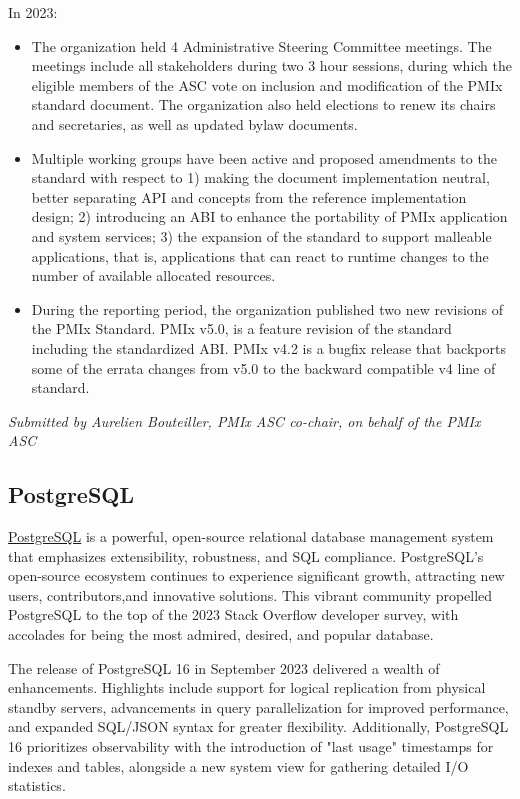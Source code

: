 \documentclass[a4paper]{report}
\begin{document}
In 2023:

\begin{itemize}

\item The organization held 4 Administrative Steering Committee meetings. The meetings include all stakeholders during two 3 hour sessions, during which the eligible members of the ASC vote on inclusion and modification of the PMIx standard document. The organization also held elections to renew its chairs and secretaries, as well as updated bylaw documents.

\item Multiple working groups have been active and proposed amendments to the standard with respect to 1) making the document implementation neutral, better separating API and concepts from the reference implementation design; 2) introducing an ABI to enhance the portability of PMIx application and system services; 3) the expansion of the standard to support malleable applications, that is, applications that can react to runtime changes to the number of available allocated resources.

\item During the reporting period, the organization published two new revisions of the PMIx Standard. PMIx v5.0, is a feature revision of the standard including the standardized ABI. PMIx v4.2 is a bugfix release that backports some of the errata changes from v5.0 to the backward compatible v4 line of standard.

\end{itemize}

{\em Submitted by Aurelien Bouteiller, PMIx ASC co-chair, on behalf of the PMIx ASC}

\subsection{PostgreSQL}

\href{https://www.postgresql.org/}{PostgreSQL} is a powerful, open-source relational database management system that emphasizes extensibility, robustness, and SQL compliance.  PostgreSQL's open-source ecosystem continues to experience significant growth, attracting new users, contributors,and innovative solutions.  This vibrant community propelled PostgreSQL to the top of the 2023 Stack Overflow developer survey, with accolades for being the most admired, desired, and popular database.

The release of PostgreSQL 16 in September 2023 delivered a wealth of enhancements. Highlights include support for logical replication from physical standby servers, advancements in query parallelization for improved performance, and expanded SQL/JSON syntax for greater flexibility. Additionally, PostgreSQL 16 prioritizes observability with the introduction of "last usage" timestamps for indexes and tables, alongside a new system view for gathering detailed I/O statistics.
\end{document}
